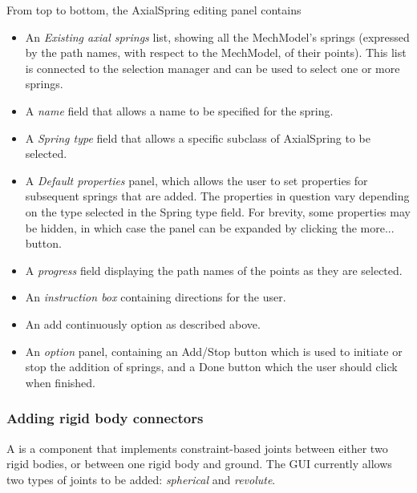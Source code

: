 \documentclass{article}
\begin{document}
From top to bottom, the AxialSpring editing panel contains

\begin{itemize}

\item An {\it Existing axial springs} list, showing all the MechModel's
springs (expressed by the path names, with respect to the MechModel,
of their points). This list is connected to the selection manager and
can be used to select one or more springs.

\item A {\it name} field that allows a name to be specified for the spring.

\item A {\it Spring type} field that allows a specific subclass of AxialSpring
to be selected.

\item A {\it Default properties} panel, which allows the user to set
properties for subsequent springs that are added. The properties in
question vary depending on the type selected in the {\sf Spring type}
field. For brevity, some properties may be hidden, in which case the
panel can be expanded by clicking the {\sf more...} button.

\item A {\it progress} field displaying the path names of the points
as they are selected.

\item An {\it instruction box} containing directions for the user.

\item An {\sf add continuously} option as described above.

\item An {\it option} panel, containing an {\sf Add/Stop} button which is used
to initiate or stop the addition of springs, and a {\sf Done} button which
the user should click when finished.

\end{itemize}

\subsubsection{Adding rigid body connectors}

A  is a component
that implements constraint-based joints between either two rigid
bodies, or between one rigid body and ground. The GUI currently allows
two types of joints to be added: {\it spherical} and {\it revolute}.
\end{document}
